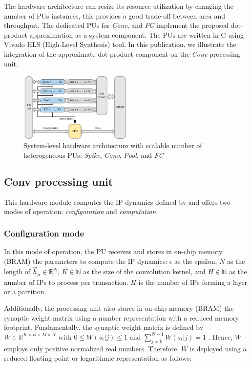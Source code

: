The hardware architecture can resize its resource utilization by changing the number of PUs instances, this provides a good trade-off between area and throughput. The dedicated PUs for \emph{Conv}, and \emph{FC} implement the proposed dot-product approximation as a system component. The PUs are written in C using Vivado HLS (High-Level Synthesis) tool. In this publication, we illustrate the integration of the approximate dot-product component on the \emph{Conv} processing unit.

\begin{figure}[t!]
	\centering
	\includegraphics[width=0.5\textwidth]{../figures/sbs_hw.pdf}
	\caption{System-level hardware architecture with scalable number of heterogeneous PUs: \emph{Spike}, \emph{Conv}, \emph{Pool}, and \emph{FC}}
	\label{fig:hw_sbs}
\end{figure}

\subsection{Conv processing unit}
This hardware module computes the IP dynamics defined by  and offers two modes of operation: \emph{configuration} and \emph{computation}.

\subsubsection{Configuration mode}
In this mode of operation, the PU receives and stores in on-chip memory (BRAM) the parameters to compute the IP dynamics: $\epsilon$ as the epsilon, $N$ as the length of $\vec{h}_\mu\in\mathbb{R}^{N}$, $K\in\mathbb{N}$ as the size of the convolution kernel, and $H\in\mathbb{N}$ as the number of IPs to process per transaction. $H$ is the number of IPs forming a layer or a partition.

Additionally, the processing unit also stores in on-chip memory (BRAM) the synaptic weight matrix using a number representation with a reduced memory footprint. Fundamentally, the synaptic weight matrix is defined by $W\in\mathbb{R}^{K\times K\times M\times N}$ with $0\le W(s_t|j)\le1$ and $\sum_{j=0}^{N-1}W(s_t|j)=1$ \cite{rotermund2019Backpropagation}. Hence, $W$ employs only positive normalized real numbers. Therefore, $W$ is deployed using a reduced floating-point or logarithmic representation as follows:


